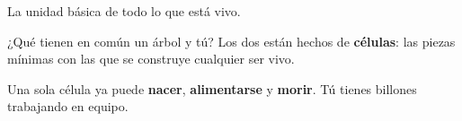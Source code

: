 

\renewcommand{\bmrtema}{Ejemplo · Guías del Profe}
\renewcommand{\bmrprofe}{Prof. Juan Diego A. Prada R.}



%
  {La unidad básica de todo lo que está vivo.}

\begin{frame}{¿Qué tienen en común un árbol y tú?}
\large
Los dos están hechos de \textbf{células}: las piezas mínimas con las que se
construye cualquier ser vivo.\par
\vspace{0.7em}
\normalsize
Una sola célula ya puede \textbf{nacer}, \textbf{alimentarse} y \textbf{morir}.
Tú tienes billones trabajando en equipo.\par
\vspace{0.6em}
\centering{}
\end{frame}



